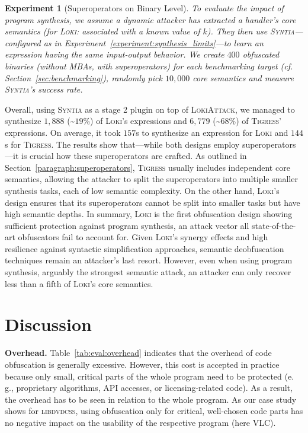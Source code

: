 \documentclass[letterpaper,twocolumn,10pt]{article}
\newcommand{\eg}{e.\,g.,\xspace}
\newcommand{\cf}{cf.\xspace}
\newcommand{\ex}[1]{Experiment~\ref{#1}}
\theoremstyle{customexample}
\theoremstyle{customexperiment}
\newtheorem{experiment}{Experiment}
\newcommand{\loki}{\textsc{Loki}\xspace}
\newcommand{\lokiattack}{\textsc{LokiAttack}\xspace}
\newcommand{\syntia}{\textsc{Syntia}\xspace}
\newcommand{\tigress}{\textsc{Tigress}\xspace}
\newcommand{\vlc}{\textsc{VLC}\xspace}
\newcommand{\libdvdcss}{\textsc{libdvdcss}\xspace}
\begin{document}
\begin{experiment}[Superoperators on Binary Level]\label{experiment:synthesis}
To evaluate the impact of program synthesis, we assume a dynamic attacker has extracted a handler's core semantics (for \loki: associated with a known value of $k$). They then use \syntia---configured as in \ex{experiment:synthesis_limits}---to learn an expression having the same input-output behavior.
We create $400$ obfuscated binaries (without MBAs, with superoperators) for each benchmarking target (\cf Section~\ref{sec:benchmarking}), randomly pick $10,000$ core semantics and measure \syntia's success rate.
\end{experiment}
Overall, using \syntia as a stage 2 plugin on top of \lokiattack, we managed to synthesize $1,888$ (\textasciitilde$19\%$) of \loki's expressions and $6,779$ (\textasciitilde$68\%$) of \tigress' expressions. On average, it took $157$s to synthesize an expression for \loki and $144$s for \tigress. The results show that---while both designs employ superoperators---it is crucial how these superoperators are crafted.
As outlined in Section~\ref{paragraph:superoperators}, \tigress usually includes independent core semantics, allowing the attacker to split the superoperators into multiple smaller synthesis tasks, each of low semantic complexity. On the other hand, \loki's design ensures that its superoperators cannot be split into smaller tasks but have high semantic depths.
In summary, \loki is the first obfuscation design showing sufficient protection against program synthesis, an attack vector all state-of-the-art obfuscators fail to account for.
Given \loki's synergy effects and high resilience against syntactic simplification approaches, semantic deobfuscation techniques remain an attacker's last resort. However, even when using program synthesis, arguably the strongest semantic attack, an attacker can only recover less than a fifth of \loki's core semantics.

 \section{Discussion}\label{sec:discussion}

\textbf{Overhead.} Table~\ref{tab:eval:overhead} indicates that the overhead of code obfuscation is generally excessive. However, this cost is accepted in practice because only small, critical parts of the whole program need to be protected (\eg proprietary algorithms, API accesses, or licensing-related code). As a result, the overhead has to be seen in relation to the whole program. 
As our case study shows for \libdvdcss, using obfuscation only for critical, well-chosen code parts has no negative impact on the usability of the respective program (here \vlc).
\end{document}
